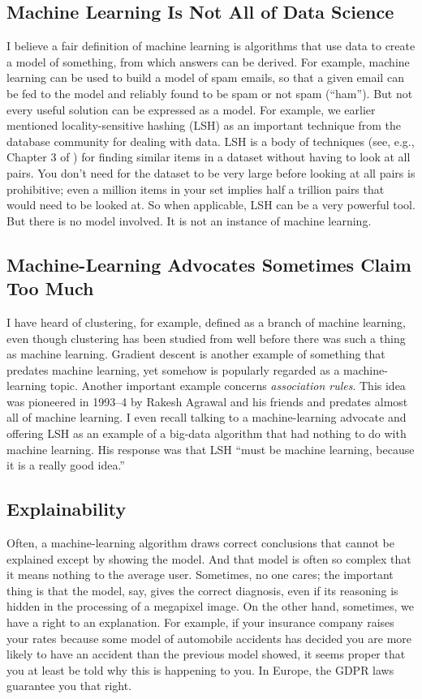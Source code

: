 \documentclass[11pt]{article}
\begin{document}
\subsection{Machine Learning Is Not All of Data Science}

I believe a fair definition of machine learning is algorithms that use data to create a model of something, from which answers can be derived.  For example, machine learning can be used to build a model of spam emails, so that a given email can be fed to the model and reliably found to be spam or not spam (``ham'').  But not every useful solution can be expressed as a model.  For example, we earlier mentioned locality-sensitive hashing (LSH) as an important technique from the database community for dealing with data.  LSH is a body of techniques (see, e.g., Chapter 3 of \cite{mmds}) for finding similar items in a dataset without having to look at all pairs.  You don't need for the dataset to be very large before looking at all pairs is prohibitive; even a million items in your set implies half a trillion pairs that would need to be looked at.  So when applicable, LSH can be a very powerful tool.  But there is no model involved.  It is not an instance of machine learning.

\subsection{Machine-Learning Advocates Sometimes Claim Too Much}

I have heard of clustering, for example, defined as a branch of machine learning, even though clustering has been studied from well before there was such a thing as machine learning.  Gradient descent is another example of something that predates machine learning, yet somehow is popularly regarded as a machine-learning topic.  Another important example concerns {\em association rules}.  This idea was pioneered in 1993--4 by Rakesh Agrawal and his friends \cite{ais} \cite{as} and predates almost all of machine learning.   I even recall talking to a machine-learning advocate and offering LSH as an example of a big-data algorithm that had nothing to do with machine learning.  His response was that LSH ``must be machine learning, because it is a really good idea.''

\subsection{Explainability}

Often, a machine-learning algorithm draws correct conclusions that cannot be explained except by showing the model.  And that model is often so complex that it means nothing to the average user.  Sometimes, no one cares; the important thing is that the model, say, gives the correct diagnosis, even if its reasoning is hidden in the processing of a megapixel image.  On the other hand, sometimes, we have a right to an explanation.  For example, if your insurance company raises your rates because some model of automobile accidents has decided you are more likely to have an accident than the previous model showed, it seems proper that you at least be told why this is happening to you.  In Europe, the GDPR laws \cite{gdpr} guarantee you that right.
\end{document}
